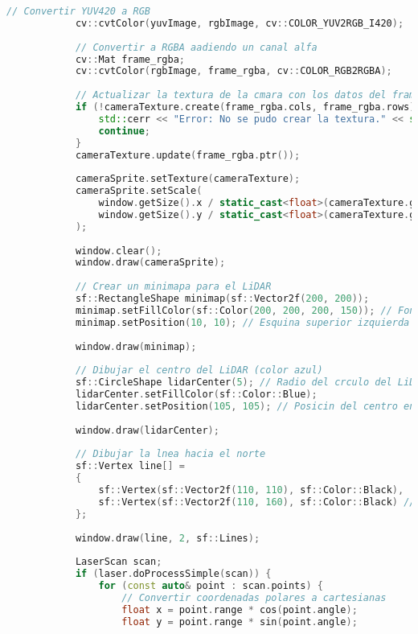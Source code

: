\begin{lstlisting}[language={C++}, caption={Primer ajuste de c\'odigo}, label={Script}]
            // Convertir YUV420 a RGB
            cv::cvtColor(yuvImage, rgbImage, cv::COLOR_YUV2RGB_I420);
    
            // Convertir a RGBA aadiendo un canal alfa
            cv::Mat frame_rgba;
            cv::cvtColor(rgbImage, frame_rgba, cv::COLOR_RGB2RGBA);
    
            // Actualizar la textura de la cmara con los datos del frame
            if (!cameraTexture.create(frame_rgba.cols, frame_rgba.rows)) {
                std::cerr << "Error: No se pudo crear la textura." << std::endl;
                continue;
            }
            cameraTexture.update(frame_rgba.ptr());
    
            cameraSprite.setTexture(cameraTexture);
            cameraSprite.setScale(
                window.getSize().x / static_cast<float>(cameraTexture.getSize().x),
                window.getSize().y / static_cast<float>(cameraTexture.getSize().y)
            );
    
            window.clear();
            window.draw(cameraSprite);
    
            // Crear un minimapa para el LiDAR
            sf::RectangleShape minimap(sf::Vector2f(200, 200));
            minimap.setFillColor(sf::Color(200, 200, 200, 150)); // Fondo semitransparente
            minimap.setPosition(10, 10); // Esquina superior izquierda
    
            window.draw(minimap);
    
            // Dibujar el centro del LiDAR (color azul)
            sf::CircleShape lidarCenter(5); // Radio del crculo del LiDAR
            lidarCenter.setFillColor(sf::Color::Blue);
            lidarCenter.setPosition(105, 105); // Posicin del centro en el minimapa
    
            window.draw(lidarCenter);
    
            // Dibujar la lnea hacia el norte
            sf::Vertex line[] =
            {
                sf::Vertex(sf::Vector2f(110, 110), sf::Color::Black),
                sf::Vertex(sf::Vector2f(110, 160), sf::Color::Black) // Lnea hacia arriba (norte)
            };
    
            window.draw(line, 2, sf::Lines);
    
            LaserScan scan;
            if (laser.doProcessSimple(scan)) {
                for (const auto& point : scan.points) {
                    // Convertir coordenadas polares a cartesianas
                    float x = point.range * cos(point.angle);
                    float y = point.range * sin(point.angle);
    

\end{lstlisting}
